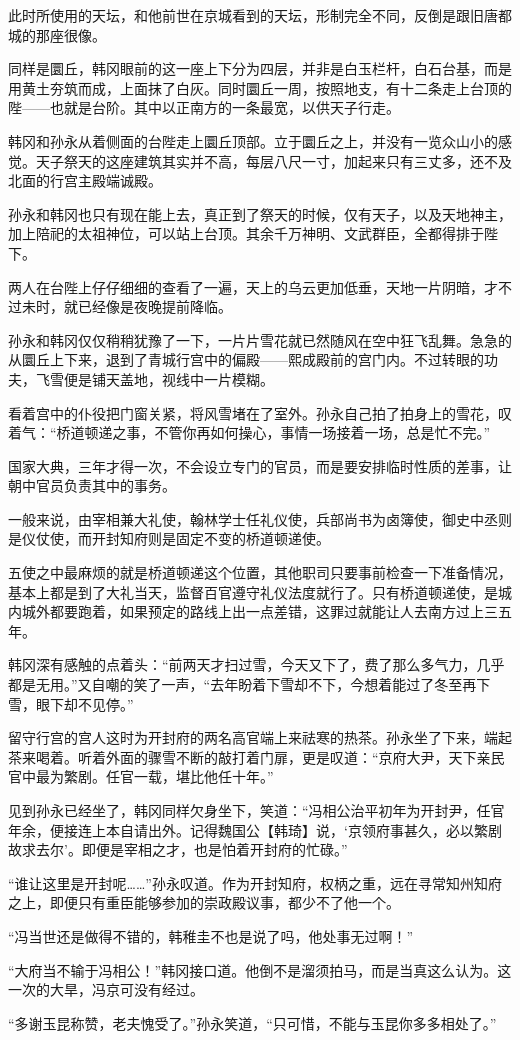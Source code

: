 此时所使用的天坛，和他前世在京城看到的天坛，形制完全不同，反倒是跟旧唐都城的那座很像。

同样是圜丘，韩冈眼前的这一座上下分为四层，并非是白玉栏杆，白石台基，而是用黄土夯筑而成，上面抹了白灰。同时圜丘一周，按照地支，有十二条走上台顶的陛——也就是台阶。其中以正南方的一条最宽，以供天子行走。

韩冈和孙永从着侧面的台陛走上圜丘顶部。立于圜丘之上，并没有一览众山小的感觉。天子祭天的这座建筑其实并不高，每层八尺一寸，加起来只有三丈多，还不及北面的行宫主殿端诚殿。

孙永和韩冈也只有现在能上去，真正到了祭天的时候，仅有天子，以及天地神主，加上陪祀的太祖神位，可以站上台顶。其余千万神明、文武群臣，全都得排于陛下。

两人在台陛上仔仔细细的查看了一遍，天上的乌云更加低垂，天地一片阴暗，才不过未时，就已经像是夜晚提前降临。

孙永和韩冈仅仅稍稍犹豫了一下，一片片雪花就已然随风在空中狂飞乱舞。急急的从圜丘上下来，退到了青城行宫中的偏殿——熙成殿前的宫门内。不过转眼的功夫，飞雪便是铺天盖地，视线中一片模糊。

看着宫中的仆役把门窗关紧，将风雪堵在了室外。孙永自己拍了拍身上的雪花，叹着气：“桥道顿递之事，不管你再如何操心，事情一场接着一场，总是忙不完。”

国家大典，三年才得一次，不会设立专门的官员，而是要安排临时性质的差事，让朝中官员负责其中的事务。

一般来说，由宰相兼大礼使，翰林学士任礼仪使，兵部尚书为卤簿使，御史中丞则是仪仗使，而开封知府则是固定不变的桥道顿递使。

五使之中最麻烦的就是桥道顿递这个位置，其他职司只要事前检查一下准备情况，基本上都是到了大礼当天，监督百官遵守礼仪法度就行了。只有桥道顿递使，是城内城外都要跑着，如果预定的路线上出一点差错，这罪过就能让人去南方过上三五年。

韩冈深有感触的点着头：“前两天才扫过雪，今天又下了，费了那么多气力，几乎都是无用。”又自嘲的笑了一声，“去年盼着下雪却不下，今想着能过了冬至再下雪，眼下却不见停。”

留守行宫的宫人这时为开封府的两名高官端上来祛寒的热茶。孙永坐了下来，端起茶来喝着。听着外面的骤雪不断的敲打着门扉，更是叹道：“京府大尹，天下亲民官中最为繁剧。任官一载，堪比他任十年。”

见到孙永已经坐了，韩冈同样欠身坐下，笑道：“冯相公治平初年为开封尹，任官年余，便接连上本自请出外。记得魏国公【韩琦】说，‘京领府事甚久，必以繁剧故求去尔’。即便是宰相之才，也是怕着开封府的忙碌。”

“谁让这里是开封呢……”孙永叹道。作为开封知府，权柄之重，远在寻常知州知府之上，即便只有重臣能够参加的崇政殿议事，都少不了他一个。

“冯当世还是做得不错的，韩稚圭不也是说了吗，他处事无过啊！”

“大府当不输于冯相公！”韩冈接口道。他倒不是溜须拍马，而是当真这么认为。这一次的大旱，冯京可没有经过。

“多谢玉昆称赞，老夫愧受了。”孙永笑道，“只可惜，不能与玉昆你多多相处了。”

